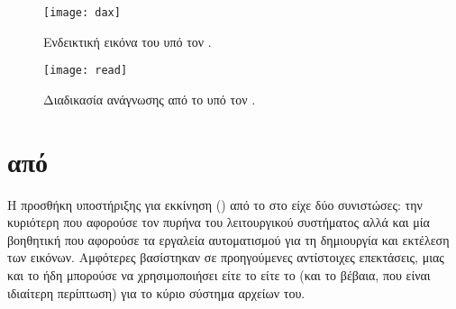 \begin{figure}
    \centering
    \texttt{[image: dax]}
    \caption{Ενδεικτική εικόνα του  υπό τον .}
    \label{fig:dax-overview}
\end{figure}

\begin{figure}
    \begin{minipage}[c][\textheight]{\textwidth}
        \centering
        \texttt{[image: read]}
        \caption{Διαδικασία ανάγνωσης από το \viofs{} υπό τον .}
        \label{fig:dax-flowchart}
    \end{minipage}
\end{figure}

\section{ από \viofs{}}

Η προσθήκη υποστήριξης για εκκίνηση () από το \viofs{} στο \osv{}
είχε δύο συνιστώσες: την κυριότερη που αφορούσε τον πυρήνα του λειτουργικού
συστήματος αλλά και μία βοηθητική που αφορούσε τα εργαλεία αυτοματισμού για τη
δημιουργία και εκτέλεση των εικόνων. Αμφότερες βασίστηκαν σε προηγούμενες
αντίστοιχες επεκτάσεις, μιας και το \osv{} ήδη μπορούσε να χρησιμοποιήσει
είτε το  είτε το  (και το  βέβαια, που είναι
ιδιαίτερη περίπτωση) για το κύριο  σύστημα αρχείων του.

